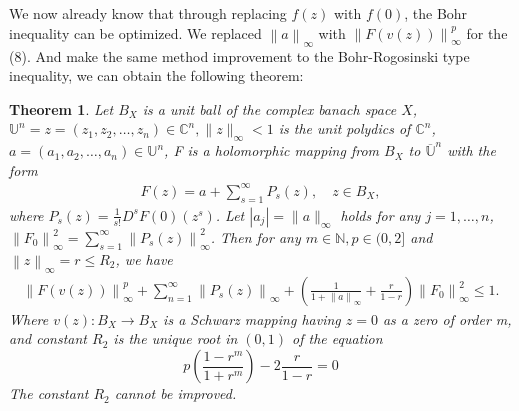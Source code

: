 \documentclass{birkjour}
\theoremstyle{plain}
\newtheorem{thm}{Theorem}
\theoremstyle{definition}
\theoremstyle{definition}
\begin{document}
We now already know that through replacing $\mathit{f}(z)$ with $\mathit{f}(0)$, the Bohr inequality can be optimized. We replaced $\left \| a \right \| _\infty $ with $\left \| F(v(z)) \right \| _\infty^p$ for the (8). And make the same method improvement to the Bohr-Rogosinski type inequality, we can obtain the following theorem:
\begin{thm}
	Let $B_X$ is a unit ball of the complex banach space $X$, $\mathbb{U}^n={z=(z_1,z_2,\dots,z_n)\in\mathbb{C}^n,\|z\|_\infty<1}$ is the unit polydics of $\mathbb{C}^n$, $a=(a_1,a_2,\dots,a_n)\in\mathbb{U}^n$, F is a holomorphic mapping from $B_X $ to $\overline {\mathbb{U}}^n$  with the form	
	\begin{align*}
		F(z)=a+\sum_{s=1}^{\infty} P_s(z),\quad z \in B_X,
	\end{align*}
	where $P_s(z)=\frac{1}{s!} D^sF(0)(z^s)$.
	Let $\left |a_j \right |=\| a \|_\infty$ holds for any $j=1,\dots ,n$, $\left \| F_0 \right \| ^2_\infty=\sum_{s=1}^{\infty}\left \| P_s(z) \right \|^2_\infty$. Then for any $m \in \mathbb{N} , p \in (0,2]$ and $\left \| z \right \| _\infty=r \le R_2$, we have
	\begin{align}
		\left \| F(v(z)) \right \| _\infty^p +\sum_{n=1}^{\infty} \left \| P_s(z) \right \| _\infty+(\frac{1}{1+\left \| a \right \| _\infty} +\frac{r}{1-r} )\left \| F_0 \right \|^2_\infty \le 1.
	\end{align}
	Where $v(z): B_X \to B_X$ is a Schwarz mapping having $z=0$ as a zero of order m, and constant $R_2$ is the unique root in $(0,1)$ of the equation
	\begin{equation}
	p(\frac{1-r^m}{1+r^m} )-2\frac{r}{1-r}=0
	\end{equation}
	The constant $R_2$ cannot be improved.
\end{thm}
\end{document}
